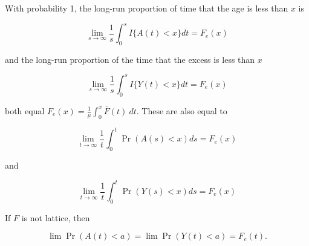 \begin{proposition}
With probability 1, the long-run proportion of time that the age is less than \(x\) is

\[
\lim_{s \to \infty} \frac{1}{s} \int_0^s I \{A(t) < x \} dt  = F_e(x) 
\]

and the long-run proportion of the time that the excess is less than \(x\)

\[
\lim_{s \to \infty} \frac{1}{s} \int_0^s I \{Y(t) < x \} dt  = F_e(x) 
\]

both equal \(F_e(x) =  \frac{1}{\mu}  \int_0^x \overline{F}(t) \ dt\). These are also equal to

\[
\lim_{t \to \infty} \frac{1}{t} \int_0^t \Pr(A(s) < x) ds = F_e(x) 
\]

and

\[
\lim_{t \to \infty} \frac{1}{t} \int_0^t \Pr(Y(s) < x) ds = F_e(x) 
\]

If \(F\) is not lattice, then

\[
\lim \Pr(A(t) < a) = \lim \Pr(Y(t) < a) = F_e(t).
\]

\end{proposition}

